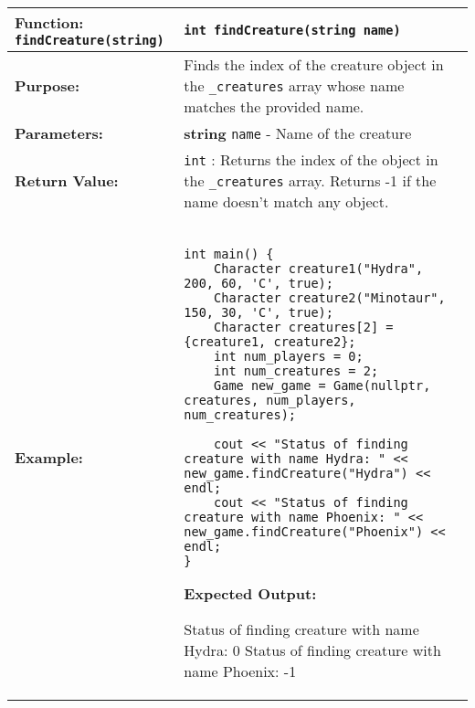 \newpage
\renewcommand{\arraystretch}{1.5}
\begin{longtable}{|p{2.0in}|p{4.0in}|}
\hline
\textbf{Function:} \texttt{findCreature(string)} & \texttt{int findCreature(string name)} \\ \hline

\textbf{Purpose:} & Finds the index of the creature object in the \texttt{_creatures} array whose name matches the provided name. \\ \hline

\textbf{Parameters:} & 
\textbf{string} \texttt{name} - Name of the creature \\ \hline

\textbf{Return Value:} & \texttt{int} : Returns the index of the object in the \texttt{_creatures} array. Returns -1 if the name doesn't match any object. \\ \hline

\textbf{Example:} & 

\begin{example}
\begin{verbatim}

int main() {
    Character creature1("Hydra", 200, 60, 'C', true);
    Character creature2("Minotaur", 150, 30, 'C', true);
    Character creatures[2] = {creature1, creature2};
    int num_players = 0;
    int num_creatures = 2;
    Game new_game = Game(nullptr, creatures, num_players, num_creatures);

    cout << "Status of finding creature with name Hydra: " << new_game.findCreature("Hydra") << endl;
    cout << "Status of finding creature with name Phoenix: " << new_game.findCreature("Phoenix") << endl;
}
\end{verbatim}
\end{example}

\textbf{Expected Output:} 

\vspace{5pt}
Status of finding creature with name Hydra: 0 \newline
Status of finding creature with name Phoenix: -1
\vspace{5pt}
\\ \hline
\end{longtable}



















